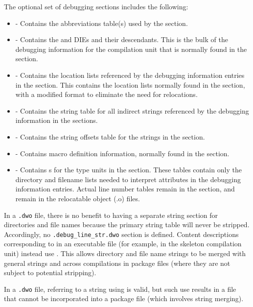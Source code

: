 The optional set of debugging sections includes the following:
\begin{itemize}
\item
\dotdebugabbrevdwo{} - Contains the abbreviations table(s) used by
the \dotdebuginfodwo{} section.
\item
\dotdebuginfodwo{} - Contains the \DWTAGcompileunit{} and
\DWTAGtypeunit{} DIEs and
their descendants. This is the bulk of the debugging
information for the compilation unit that is normally found
in the \dotdebuginfo{} section.
\item
\dotdebuglocdwo{} - Contains the location lists referenced by
the debugging information entries in the \dotdebuginfodwo{}
section. This contains the location lists normally found in 
the \dotdebugloc{} section, with a 
modified format to eliminate the need for relocations.
\item
\dotdebugstrdwo{} - Contains the string table for all indirect
strings referenced by the debugging information in the
\dotdebuginfodwo{} sections.
\item
\dotdebugstroffsetsdwo{} - Contains the string offsets table
for the strings in the \dotdebugstrdwo{}{} section.
\item
\dotdebugmacrodwo{} - Contains macro definition information,
normally found in the \dotdebugmacro{} section.
\item
\dotdebuglinedwo{} - Contains s 
for the type units in the \dotdebuginfodwo{} section. These tables
contain only the directory and filename lists needed to
interpret \DWATdeclfile{} attributes in the debugging
information entries. Actual line number tables remain in the
\dotdebugline{} section, and remain in the relocatable object
(.o) files.

\end{itemize}

In a \texttt{.dwo} file, there is no benefit to having a separate string
section for directories and file names because the primary
string table will never be stripped. Accordingly, no
\texttt{.debug\_line\_str.dwo} section is defined. Content descriptions 
corresponding to \DWFORMlinestrp{} in an executable file (for example, 
in the skeleton compilation unit) instead use \DWFORMstrx. This allows
directory and file name strings to be merged with general
strings and across compilations in package files 
(where they are not subject to potential stripping).

In a \texttt{.dwo} file, referring to a string using \DWFORMstrp{}
is valid, but such use 
results in a file that cannot be incorporated into a package file
(which involves string merging).

